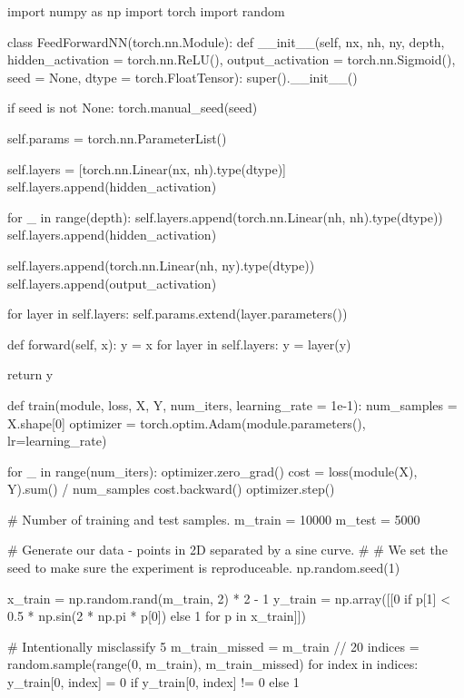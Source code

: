 \begin{DoxyCode}
import numpy as np
import torch
import random

class FeedForwardNN(torch.nn.Module):
    def \_\_init\_\_(self, nx, nh, ny, depth, hidden\_activation = torch.nn.ReLU(),
                 output\_activation = torch.nn.Sigmoid(), seed = None, dtype = torch.FloatTensor):
        super().\_\_init\_\_()

        if seed is not None:
            torch.manual\_seed(seed)

        self.params = torch.nn.ParameterList()

        self.layers = [torch.nn.Linear(nx, nh).type(dtype)]
        self.layers.append(hidden\_activation)

        for \_ in range(depth):
            self.layers.append(torch.nn.Linear(nh, nh).type(dtype))
            self.layers.append(hidden\_activation)

        self.layers.append(torch.nn.Linear(nh, ny).type(dtype))
        self.layers.append(output\_activation)

        for layer in self.layers:
            self.params.extend(layer.parameters())

    def forward(self, x):
        y = x
        for layer in self.layers:
            y = layer(y)

        return y

def train(module, loss, X, Y, num\_iters, learning\_rate = 1e-1):
    num\_samples = X.shape[0]
    optimizer = torch.optim.Adam(module.parameters(), lr=learning\_rate)

    for \_ in range(num\_iters):
        optimizer.zero\_grad()
        cost = loss(module(X), Y).sum() / num\_samples 
        cost.backward()
        optimizer.step()

# Number of training and test samples.
m\_train = 10000
m\_test  = 5000

# Generate our data - points in 2D separated by a sine curve.
#
# We set the seed to make sure the experiment is reproduceable.
np.random.seed(1)

x\_train = np.random.rand(m\_train, 2) * 2 - 1
y\_train = np.array([[0 if p[1] < 0.5 * np.sin(2 * np.pi * p[0]) else 1 for p in x\_train]])

# Intentionally misclassify 5%
m\_train\_missed = m\_train // 20
indices = random.sample(range(0, m\_train), m\_train\_missed)
for index in indices:
    y\_train[0, index] = 0 if y\_train[0, index] != 0 else 1


\end{DoxyCode}
